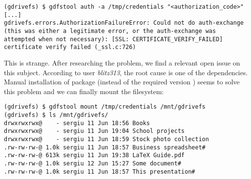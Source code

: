 \begin{lstlisting}[caption=GDriveFS authentication error]
(gdrivefs) $ gdfstool auth -a /tmp/credentials "<authorization_code>"
[...]
gdrivefs.errors.AuthorizationFailureError: Could not do auth-exchange (this was either a legitimate error, or the auth-exchange was attempted when not necessary): [SSL: CERTIFICATE_VERIFY_FAILED] certificate verify failed (_ssl.c:726)
\end{lstlisting}

This is strange. After researching the problem, we find a relevant open issue on this subject\cite{gdrivefs_ssl_handshake_error}. According to user \emph{blitz313}, the root cause is one of the dependencies. Manual installation of package  (instead of the required version ) seems to solve this problem and we can finally mount the filesystem:

\begin{lstlisting}[caption=GDriveFS filesystem mount]
(gdrivefs) $ gdfstool mount /tmp/credentials /mnt/gdrivefs
(gdrivefs) $ ls /mnt/gdrivefs/
drwxrwxrwx@    - sergiu 11 Jun 18:56 Books
drwxrwxrwx@    - sergiu 11 Jun 19:04 School projects
drwxrwxrwx@    - sergiu 11 Jun 18:59 Stock photo collection
.rw-rw-rw-@ 1.0k sergiu 11 Jun 18:57 Business spreadsheet#
.rw-rw-rw-@ 613k sergiu 11 Jun 19:38 LaTeX Guide.pdf
.rw-rw-rw-@ 1.0k sergiu 12 Jun 15:27 Some document#
.rw-rw-rw-@ 1.0k sergiu 11 Jun 18:57 This presentation#
\end{lstlisting}


